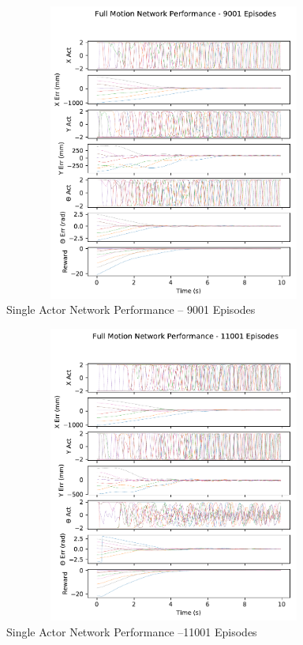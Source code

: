 \begin{figure}[H]
	\centering
	\includegraphics[width=6in, height=3.85in, keepaspectratio]{figures/train_figs/all_transitions/3_9001.pdf}
	\caption{Single Actor Network Performance -- 9001 Episodes}
\end{figure}
\begin{figure}[H]
	\centering
	\includegraphics[width=6in, height=3.85in, keepaspectratio]{figures/train_figs/all_transitions/3_11001.pdf}
	\caption{Single Actor Network Performance --11001 Episodes}
\end{figure}
